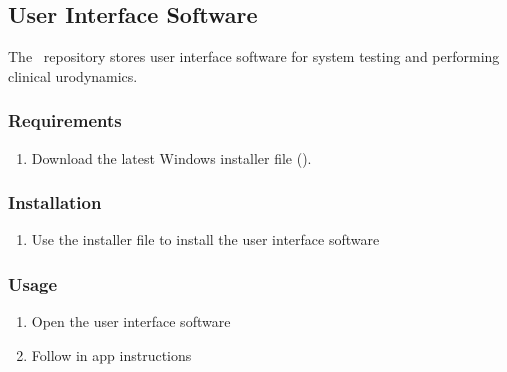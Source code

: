\subsection{User Interface Software}

The \uiswrepo \ repository stores user interface software for system testing and performing clinical urodynamics. 

\subsubsection{Requirements}

\begin{enumerate}
    \item Download the latest Windows installer file (\uilatestswrepo).
\end{enumerate}

\subsubsection{Installation}

\begin{enumerate}
    \item Use the installer file to install the user interface software
\end{enumerate}

\subsubsection{Usage}
\begin{enumerate}
    \item Open the user interface software
    \item Follow in app instructions
\end{enumerate}

\clearpage